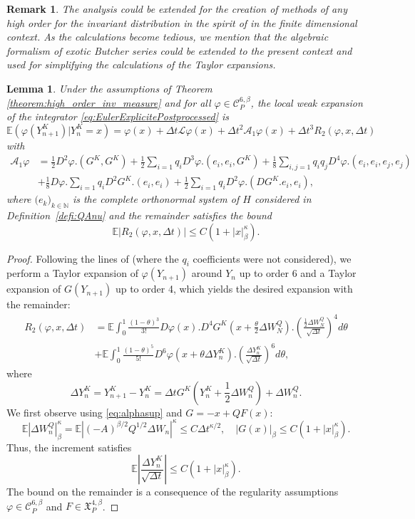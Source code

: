 \documentclass[11pt]{amsart}
\newcommand{\E}{\mathbb{E}}
\newcommand{\IE}{\mathbb{E}}
\newcommand{\ts}{\thinspace}
\newcommand{\N}{\mathbb{N}}
\newtheorem{lemma}[theo]{Lemma}
\newtheorem{remark}[theo]{Remark}
\begin{document}
\begin{remark}
The analysis could be extended for the creation of methods of any high order for the invariant distribution in the spirit of \cite{Abdulle14hon} in the finite dimensional context. As the calculations become tedious, we mention that the algebraic formalism of exotic Butcher series \cite{Bronasco22ebs, Bronasco22cef, Laurent21ata, Laurent20eab} could be extended to the present context and used for simplifying the calculations of the Taylor expansions.
\end{remark}


\begin{lemma}
\label{lemma:second_order_exp}
Under the assumptions of Theorem \ref{theorem:high_order_inv_measure} and for all $\varphi\in \mathcal{C}^{6,\beta}_P$, the local weak expansion of the integrator \eqref{eq:EulerExplicitePostprocessed} is
$$\IE(\varphi(Y_{n+1}^K)|Y_{n}^K=x)= \varphi(x) + \Delta t{\mathcal L} \varphi(x) + \Delta t^2 {\mathcal A}_{1}\varphi(x)+\Delta t^3 R_{2}(\varphi,x,\Delta t)$$ 
with
$$
\begin{aligned}
{\mathcal A}_{1} \varphi&=\frac 12D^2\varphi.(G^K,G^K) + \frac 12 \sum_{i=1} q_iD^3\varphi.(e_i, e_i,G^K) + \frac{1}8 \sum_{i,j=1} q_i q_jD^4\varphi.(e_i,e_i,e_j,e_j)\\
&+\frac18 D\varphi. \sum_{i=1} q_iD^2G^K.(e_i,e_i) + \frac 12 \sum_{i=1} q_iD^2\varphi.(DG^K.e_i, e_i),
\end{aligned}
$$
where $\bigl(e_k\bigr)_{k\in\N}$ is the complete orthonormal system of $H$ considered in Definition~\ref{defi:QAnu} and the remainder satisfies the bound
$$\E|R_{2}(\varphi,x,\Delta t)|\leq C(1+|x|_\beta^\kappa).$$
\end{lemma}


\begin{proof}
Following the lines of \cite[Sect.\ts 7]{Vilmart15pif} (where the $q_i$ coefficients were not considered), we perform a Taylor expansion of $\varphi(Y_{n+1})$ around $Y_n$ up to order 6 and a Taylor expansion of $G(Y_{n+1})$ up to order 4, which yields the desired expansion with the remainder:
$$
\begin{aligned}
R_{2}(\varphi,x,\Delta t) &=
\IE
\int_0^1 \frac{(1-\theta)^3}{3!} 
D\varphi(x).D^4G^K(x+\frac \theta2\Delta W_{N}^Q).
(\frac{\frac12\Delta W_{N}^Q}{\sqrt{\Delta t}})^4 d\theta\\
&+
\IE
\int_0^1 \frac{(1-\theta)^5}{5!} 
D^6\varphi(x+\theta\Delta Y_n^K).
(\frac{\Delta Y_n^K}{\sqrt{\Delta t}})^6 d\theta,
\end{aligned}$$
where
$$\Delta Y_n^K=Y_{n+1}^K-Y_{n}^K=\Delta tG^K(Y_{n}^K+\frac12\Delta W_{n}^{Q})+\Delta W_{n}^{Q}.
$$
%
We first observe using \eqref{eq:alphasup} and $G=-x+QF(x)$:
\[
\E|\Delta W_n^Q|_\beta^\kappa=\E|(-A)^{\beta/2}Q^{1/2}\Delta W_n|^\kappa\leq C\Delta t^{\kappa/2},\quad
|G(x)|_\beta\leq C(1+|x|_\beta^\kappa).
\]
Thus, the increment satisfies
\[
\E|\frac{\Delta Y_n^K}{\sqrt{\Delta t}}|\leq C(1+|x|_\beta^\kappa).
\]
The bound on the remainder is a consequence of the regularity assumptions $\varphi\in \mathcal{C}^{6,\beta}_P$ and $F\in \mathfrak{X}^{4,\beta}_P$.
\end{proof}
\end{document}
